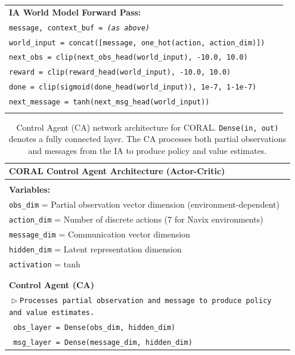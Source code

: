 \documentclass[letterpaper]{article}
\begin{document}
\begin{appendix}
\begin{table}[!htbp]
\begin{tabular}{@{}p{0.95\linewidth}@{}}
\\
\textbf{IA World Model Forward Pass:} \\
\texttt{message, context\_buf = \textit{(as above)}} \\
\texttt{world\_input = concat([message, one\_hot(action, action\_dim)])} \\
\texttt{next\_obs = clip(next\_obs\_head(world\_input), -10.0, 10.0)} \\
\texttt{reward = clip(reward\_head(world\_input), -10.0, 10.0)} \\
\texttt{done = clip(sigmoid(done\_head(world\_input)), 1e-7, 1-1e-7)} \\
\texttt{next\_message = tanh(next\_msg\_head(world\_input))} \\
\\
\bottomrule[\heavyrulewidth]
\end{tabular}
\end{table}
\begin{table}[!htbp]
\centering
\caption{Control Agent (CA) network architecture for CORAL. \texttt{Dense(in, out)} denotes a fully connected layer. The CA processes both partial observations and messages from the IA to produce policy and value estimates.}
\label{tab:coral_ca_architecture}
\begin{tabular}{@{}p{0.95\linewidth}@{}}
\toprule[\heavyrulewidth]
\textbf{CORAL Control Agent Architecture (Actor-Critic)} \\
\midrule
\\
\textbf{Variables:} \\
\texttt{obs\_dim} = Partial observation vector dimension (environment-dependent) \\
\texttt{action\_dim} = Number of discrete actions (7 for Navix environments) \\
\texttt{message\_dim} = Communication vector dimension \\
\texttt{hidden\_dim} = Latent representation dimension \\
\texttt{activation} = tanh \\
\\ \hline \\
\textbf{Control Agent (CA)} \\
\texttt{$\vartriangleright$\hspace{0.5em}Processes partial observation and message to produce policy and value estimates.} \\
\texttt{  obs\_layer = Dense(obs\_dim, hidden\_dim)} \\
\texttt{  msg\_layer = Dense(message\_dim, hidden\_dim)} \\

\end{tabular}
\end{table}
\end{appendix}
\end{document}
